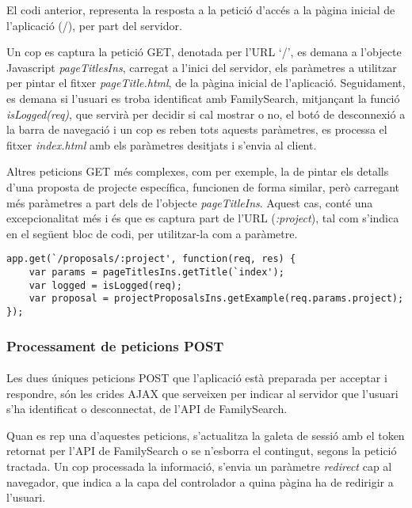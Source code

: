     El codi anterior, representa la resposta a la petició d'accés a la pàgina inicial de l'aplicació (/), per part del servidor.

    Un cop es captura la petició GET, denotada per l'URL `/',  es demana a l'objecte Javascript \emph{pageTitlesIns}, carregat a l'inici del servidor, els paràmetres a utilitzar per pintar el fitxer \emph{pageTitle.html}, de la pàgina inicial de l'aplicació. Seguidament, es demana si l’usuari es troba identificat amb FamilySearch, mitjançant la funció \emph{isLogged(req)}, que servirà per decidir si cal mostrar o no, el botó de desconnexió a la barra de navegació i un cop es reben tots aquests paràmetres, es processa el fitxer \emph{index.html} amb els paràmetres desitjats i s'envia al client.

    Altres peticions GET més complexes, com per exemple, la de pintar els detalls d'una proposta de projecte específica, funcionen de forma similar, però carregant més paràmetres a part dels de l'objecte \emph{pageTitleIns}. Aquest cas, conté una ex\-cep\-cio\-na\-li\-tat més i és que es captura part de l'URL (\emph{:project}), tal com s'indica en el següent bloc de codi, per utilitzar-la com a paràmetre.

    \begin{lstlisting}[style=rawOwn,caption={Exemple d'utilització com a paràmetre, d'una part de l'URL}]
app.get(`/proposals/:project', function(req, res) {
    var params = pageTitlesIns.getTitle(`index');
    var logged = isLogged(req);
    var proposal = projectProposalsIns.getExample(req.params.project);
});
    \end{lstlisting}


    \subsubsection{Processament de peticions POST}

    \paragraph{}
    Les dues úniques peticions POST que l'aplicació està preparada per acceptar i respondre, són les crides AJAX que serveixen per indicar al servidor que l'usuari s'ha identificat o desconnectat, de l'API de FamilySearch.

    Quan es rep una d'aquestes peticions, s'actualitza la galeta de sessió amb el token retornat per l'API de FamilySearch o se n'esborra el contingut, segons la petició tractada. Un cop processada la informació, s'envia un paràmetre \emph{redirect} cap al navegador, que indica a la capa del controlador a quina pàgina ha de redirigir a l'usuari.

